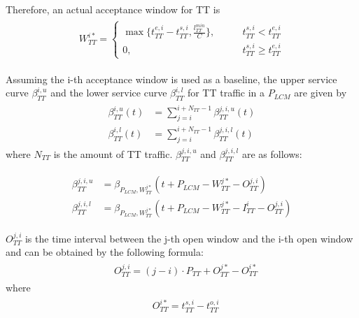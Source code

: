 \documentclass[electronics,article,accept,moreauthors,pdftex]{Definitions/mdpi}
\begin{document}
Therefore, an actual acceptance window for TT is
\begin{gather}
\begin{align}
	W^{i*}_{TT}=\begin{cases}
	\max \{t^{e,i}_{TT}-t^{s,i}_{TT}, \frac{l^{min}_{TT}}C \},
	\qquad & t^{s,i}_{TT} < t^{e,i}_{TT} \\
	0, \qquad  & t^{s,i}_{TT} \geq t^{e,i}_{TT}
\end{cases}
\end{align}
\end{gather}

Assuming the i-th acceptance window is used as a baseline, the upper service curve $\beta^{i,u}_{TT}$ and the lower service curve $\beta^{i,l}_{TT}$ for TT traffic in a $P_{LCM}$ are given by
\begin{gather}
\begin{align}
	\beta^{i,u}_{TT}(t) &= \sum_{j=i}^{i+N_{TT}-1} \beta^{j,i,u}_{TT}(t)\\
	\beta^{i,l}_{TT}(t) &= \sum_{j=i}^{i+N_{TT}-1} \beta^{j,i,l}_{TT}(t)
\end{align}
\end{gather}
where $N_{TT}$ is the amount of TT traffic. $\beta^{j,i,u}_{TT}$ and $\beta^{j,i,l}_{TT}$ are as follows:

\begin{gather}
\begin{align}
	\beta^{j,i,u}_{TT} &= \beta_{P_{LCM},W^{j*}_{TT}}(t+P_{LCM}-W^{j*}_{TT}-O^{j,i}_{TT})\\
	\beta^{j,i,l}_{TT} &= \beta_{P_{LCM},W^{j*}_{TT}}(t+P_{LCM}-W^{j*}_{TT}-I^i_{TT}-O^{j,i}_{TT})
\end{align}
\end{gather}

$O^{j,i}_{TT}$ is the time interval between the j-th open window and the i-th open window and can be obtained by the following formula:
\begin{gather}
\begin{align}
&	O^{j,i}_{TT} = (j-i) \cdot P_{TT} + O^{j*}_{TT} - O^{i*}_{TT}
\end{align}
\end{gather}
where
\begin{gather}
\begin{align}
&	O^{i*}_{TT} = t^{s,i}_{TT} - t^{o,i}_{TT}
\end{align}
\end{gather}
\end{document}

